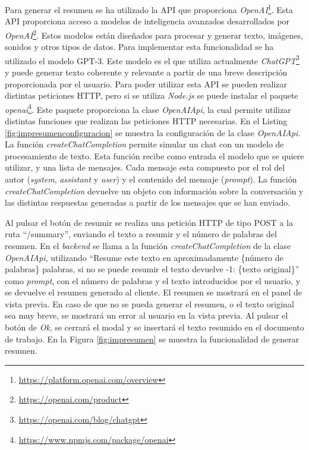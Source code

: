 Para generar el resumen se ha utilizado la API que proporciona \textit{OpenAI}\footnote{\url{https://platform.openai.com/overview}}. Esta API proporciona acceso a modelos de inteligencia avanzados desarrollados por \textit{OpenAI}\footnote{\url{https://openai.com/product}}. Estos modelos están diseñados para procesar y generar texto, imágenes, sonidos y otros tipos de datos. Para implementar esta funcionalidad se ha utilizado el modelo GPT-3. Este modelo es el que utiliza actualmente \textit{ChatGPT}\footnote{\url{https://openai.com/blog/chatgpt}} y puede generar texto coherente y relevante a partir de una breve descripción proporcionada por el usuario. Para poder utilizar esta API se pueden realizar distintas peticiones HTTP, pero si se utiliza \textit{Node.js} se puede instalar el paquete \textit{openai}\footnote{\url{https://www.npmjs.com/package/openai}}. Este paquete proporciona la clase \textit{OpenAIApi}, la cual permite utilizar distintas funciones que realizan las peticiones HTTP necesarias. En el Listing \ref{fig:impresumenconfiguracion} se muestra la configuración de la clase \textit{OpenAIApi}. La función \textit{createChatCompletion} permite simular un chat con un modelo de procesamiento de texto. Esta función recibe como entrada el modelo que se quiere utilizar, y una lista de mensajes. Cada mensaje esta compuesto por el rol del autor (\textit{system}, \textit{assistant} y \textit{user}) y el contenido del mensaje (\textit{prompt}). La función \textit{createChatCompletion} devuelve un objeto con información sobre la conversación y las distintas respuestas generadas a partir de los mensajes que se han enviado.

Al pulsar el botón de resumir se realiza una petición HTTP de tipo POST a la ruta ``/summary'', enviando el texto a resumir y el número de palabras del resumen. En el \textit{backend} se llama a la función \textit{createChatCompletion} de la clase \textit{OpenAIApi}, utilizando ``Resume este texto en aproximadamente \{número de palabras\} palabras, si no se puede resumir el texto devuelve -1: \{texto original\}'' como \textit{prompt}, con el número de palabras y el texto introducidos por el usuario, y se devuelve el resumen generado al cliente. El resumen se mostrará en el panel de vista previa. En caso de que no se pueda generar el resumen, o el texto original sea muy breve, se mostrará un error al usuario en la vista previa. Al pulsar el botón de \textit{Ok}, se cerrará el modal y se insertará el texto resumido en el documento de trabajo. En la Figura \ref{fig:impresumen} se muestra la funcionalidad de generar resumen.

